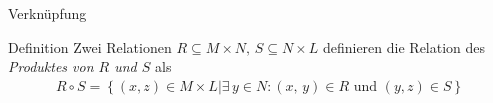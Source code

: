 \documentclass[18pt]{beamer}
\begin{document}
\begin{frame}{Verknüpfung}
    \begin{block}{Definition}
        Zwei Relationen $R\subseteq M \times N ,\, S\subseteq N\times L$ definieren die Relation des \emph{Produktes von $R$ und $S$} als
        \begin{align*}
            R \circ S = \left\{\left( x,z\right)\in M\times L | \exists\, y \in N :\left( x,\, y\right) \in R \text{ und } \left( y, z\right) \in S\right\}
        \end{align*}
    \end{block}
    \pause
\end{frame}
\end{document}
